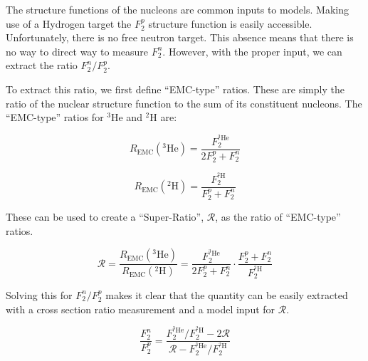 The structure functions of the nucleons are common inputs to models. Making use of a Hydrogen target the $F_2^p$ structure function is easily accessible. Unfortunately, there is no free neutron target. This absence means that there is no way to direct way to measure $F_2^n$. However, with the proper input, we can extract the ratio $F_2^n/F_2^p$.

To extract this ratio, we first define ``EMC-type'' ratios. These are simply the ratio of the nuclear structure function to the sum of its constituent nucleons. The ``EMC-type'' ratios for $^3$He and $^2$H are:

\begin{equation}
	R_{\text{EMC}}\left(^3\text{He}\right) = \frac{F_2^{^3\text{He}}}{2F_2^p + F_2^n}
\end{equation}

\begin{equation}
	R_{\text{EMC}}\left(^2\text{H}\right) = \frac{F_2^{^2\text{H}}}{F_2^p + F_2^n}
\end{equation}

These can be used to create a ``Super-Ratio'', $\mathcal{R}$, as the ratio of ``EMC-type'' ratios.

\begin{equation}
	\mathcal{R} = \frac{R_{\text{EMC}}\left(^3\text{He}\right)}{R_{\text{EMC}}\left(^2\text{H}\right)} = \frac{F_2^{^3\text{He}}}{2F_2^p + F_2^n} \cdot \frac{F_2^p + F_2^n}{F_2^{^2\text{H}}}
\end{equation}

Solving this for $F_2^n/F_2^p$ makes it clear that the quantity can be easily extracted with a cross section ratio measurement and a model input for $\mathcal{R}$.

\begin{equation}
	\frac{F_2^n}{F_2^p} = \frac{F_2^{^3\text{He}}/F_2^{^2\text{H}} - 2\mathcal{R}}{\mathcal{R} - F_2^{^3\text{He}}/F_2^{^2\text{H}}}
\end{equation}